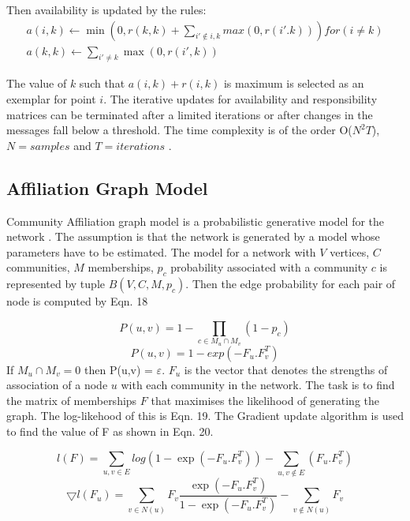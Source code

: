 Then availability is updated by the rules:\\

\begin{align}
a(i,k)  \leftarrow \min \left( 0 , r(k,k) + \sum_{i'\notin {i,k}}  max(0,r(i'.k)) \right) for (i \neq k)\\
a(k,k) \leftarrow \sum_{i' \neq k} \max \left( 0, r(i',k)  \right)
\end{align}

The value of $k$ such that $a(i,k)+r(i,k)$ is maximum is selected as an exemplar for point $i$. The iterative updates for availability and responsibility matrices can be terminated after a limited iterations or after changes in the messages fall below a threshold. The time complexity is of the order O($N^2 T$), $N = samples$ and $T = iterations$ \cite{aps:48}.   

\subsection{Affiliation Graph Model} 

Community Affiliation graph model is a probabilistic generative model for the network \cite{aps:49} \cite{aps:53}. The assumption is that the network is generated by a model whose parameters have to be estimated. The model for a network with $V$ vertices, $C$ communities, $M$ memberships, $p_c$ probability associated with a community $c$ is represented by tuple $B(V,C,M,{p_c})$. Then the edge probability for each pair of node is computed by Eqn. 18

\begin{equation}
P(u,v) = 1 - \prod_{c \in M_u \cap M_v} (1 - p_c)
\end{equation} 
\begin{equation}
P(u,v) = 1 - exp(-F_u.F_v^T)
\end{equation} 
If $M_u \cap M_v = 0$ then P(u,v) = $\varepsilon$. $F_u$ is the vector that denotes the strengths of association of a node $u$ with each community in the network. The task is to find the matrix of memberships $F$ that maximises the likelihood of generating the graph. The log-likehood of this is Eqn. 19. The Gradient update algorithm is used to find the value of F as shown in Eqn. 20. 

\begin{equation}
l(F) = \sum_{u,v \in E} log(1 - \exp(-F_u.F_v^T)) - \sum_{u,v \notin E}(F_u.F_v^T)
\end{equation}
\begin{equation}
\bigtriangledown l(F_u) = \sum_{v \in N(u)} F_v \frac{\exp(-F_u.F_v^T)}{1 - \exp(-F_u.F_v^T)} - \sum_{v \notin N(u)} F_v
\end{equation}


